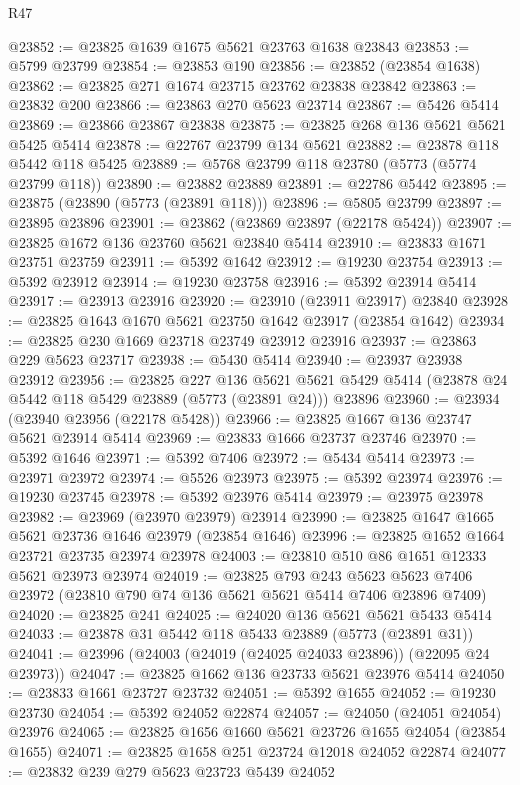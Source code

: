 \begin{lexlean}{R47}
\begin{coremodule}
@23852 := @23825 @1639 @1675 @5621 @23763 @1638 @23843
@23853 := @5799 @23799
@23854 := @23853 @190
@23856 := @23852 (@23854 @1638)
@23862 := @23825 @271 @1674 @23715 @23762 @23838 @23842
@23863 := @23832 @200
@23866 := @23863 @270 @5623 @23714
@23867 := @5426 @5414
@23869 := @23866 @23867 @23838
@23875 := @23825 @268 @136 @5621 @5621 @5425 @5414
@23878 := @22767 @23799 @134 @5621
@23882 := @23878 @118 @5442 @118 @5425
@23889 := @5768 @23799 @118 @23780 (@5773 (@5774 @23799 @118))
@23890 := @23882 @23889
@23891 := @22786 @5442
@23895 := @23875 (@23890 (@5773 (@23891 @118)))
@23896 := @5805 @23799
@23897 := @23895 @23896
@23901 := @23862 (@23869 @23897 (@22178 @5424))
@23907 := @23825 @1672 @136 @23760 @5621 @23840 @5414
@23910 := @23833 @1671 @23751 @23759
@23911 := @5392 @1642
@23912 := @19230 @23754
@23913 := @5392 @23912
@23914 := @19230 @23758
@23916 := @5392 @23914 @5414
@23917 := @23913 @23916
@23920 := @23910 (@23911 @23917) @23840
@23928 := @23825 @1643 @1670 @5621 @23750 @1642 @23917 (@23854 @1642)
@23934 := @23825 @230 @1669 @23718 @23749 @23912 @23916
@23937 := @23863 @229 @5623 @23717
@23938 := @5430 @5414
@23940 := @23937 @23938 @23912
@23956 := @23825
    @227
    @136
    @5621
    @5621
    @5429
    @5414
    (@23878 @24 @5442 @118 @5429 @23889 (@5773 (@23891 @24)))
    @23896
@23960 := @23934 (@23940 @23956 (@22178 @5428))
@23966 := @23825 @1667 @136 @23747 @5621 @23914 @5414
@23969 := @23833 @1666 @23737 @23746
@23970 := @5392 @1646
@23971 := @5392 @7406
@23972 := @5434 @5414
@23973 := @23971 @23972
@23974 := @5526 @23973
@23975 := @5392 @23974
@23976 := @19230 @23745
@23978 := @5392 @23976 @5414
@23979 := @23975 @23978
@23982 := @23969 (@23970 @23979) @23914
@23990 := @23825 @1647 @1665 @5621 @23736 @1646 @23979 (@23854 @1646)
@23996 := @23825 @1652 @1664 @23721 @23735 @23974 @23978
@24003 := @23810 @510 @86 @1651 @12333 @5621 @23973 @23974
@24019 := @23825
    @793
    @243
    @5623
    @5623
    @7406
    @23972
    (@23810 @790 @74 @136 @5621 @5621 @5414 @7406 @23896 @7409)
@24020 := @23825 @241
@24025 := @24020 @136 @5621 @5621 @5433 @5414
@24033 := @23878 @31 @5442 @118 @5433 @23889 (@5773 (@23891 @31))
@24041 := @23996 (@24003 (@24019 (@24025 @24033 @23896)) (@22095 @24 @23973))
@24047 := @23825 @1662 @136 @23733 @5621 @23976 @5414
@24050 := @23833 @1661 @23727 @23732
@24051 := @5392 @1655
@24052 := @19230 @23730
@24054 := @5392 @24052 @22874
@24057 := @24050 (@24051 @24054) @23976
@24065 := @23825 @1656 @1660 @5621 @23726 @1655 @24054 (@23854 @1655)
@24071 := @23825 @1658 @251 @23724 @12018 @24052 @22874
@24077 := @23832 @239 @279 @5623 @23723 @5439 @24052

\end{coremodule}
\end{lexlean}
